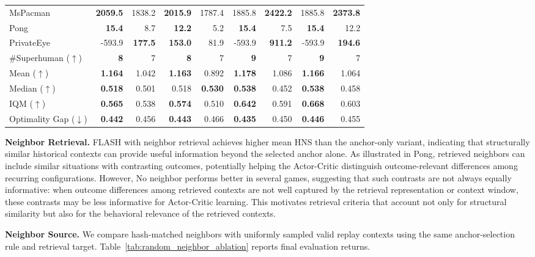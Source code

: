 \documentclass{article} %
\begin{document}
\begin{table}[!htbp]
{\begin{tabular}{@{}lrrrrrrrr@{}}
MsPacman & \textbf{2059.5} & 1838.2 & \textbf{2015.9} & 1787.4 & 1885.8 & \textbf{2422.2} & 1885.8 & \textbf{2373.8} \\
Pong & \textbf{15.4} & 8.7 & \textbf{12.2} & 5.2 & \textbf{15.4} & 7.5 & \textbf{15.4} & 12.2 \\
PrivateEye & -593.9 & \textbf{177.5} & \textbf{153.0} & 81.9 & -593.9 & \textbf{911.2} & -593.9 & \textbf{194.6} \\
\midrule
\#Superhuman ($\uparrow$) & \textbf{8} & 7 & \textbf{8} & 7 & \textbf{9} & 7 & \textbf{9} & 7 \\
Mean ($\uparrow$) & \textbf{1.164} & 1.042 & \textbf{1.163} & 0.892 & \textbf{1.178} & 1.086 & \textbf{1.166} & 1.064 \\
Median ($\uparrow$) & \textbf{0.518} & 0.501 & 0.518 & \textbf{0.530} & \textbf{0.538} & 0.452 & \textbf{0.538} & 0.458 \\
IQM ($\uparrow$) & \textbf{0.565} & 0.538 & \textbf{0.574} & 0.510 & \textbf{0.642} & 0.591 & \textbf{0.668} & 0.603 \\
Optimality Gap ($\downarrow$) & \textbf{0.442} & 0.456 & \textbf{0.443} & 0.466 & \textbf{0.435} & 0.450 & \textbf{0.446} & 0.455 \\
\bottomrule
\end{tabular}
}
\end{table}
\FloatBarrier

\noindent\textbf{Neighbor Retrieval.} FLASH with neighbor retrieval achieves higher mean HNS than the anchor-only variant, indicating that structurally similar historical contexts can provide useful information beyond the selected anchor alone. As illustrated in Pong, retrieved neighbors can include similar situations with contrasting outcomes, potentially helping the Actor-Critic distinguish outcome-relevant differences among recurring configurations. However, No neighbor performs better in several games, suggesting that such contrasts are not always equally informative: when outcome differences among retrieved contexts are not well captured by the retrieval representation or context window, these contrasts may be less informative for Actor-Critic learning. This motivates retrieval criteria that account not only for structural similarity but also for the behavioral relevance of the retrieved contexts.

\noindent\textbf{Neighbor Source.} We compare hash-matched neighbors with uniformly sampled valid replay contexts using the same anchor-selection rule and retrieval target. Table~\ref{tab:random_neighbor_ablation} reports final evaluation returns.
\end{document}
